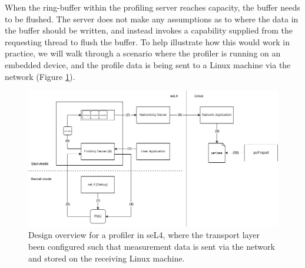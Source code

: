 When the ring-buffer within the profiling server reaches capacity, the buffer needs to be flushed. The server does not make any assumptions as to where the data in the buffer should be written, and instead invokes a capability supplied from the requesting thread to flush the buffer. To help illustrate how this would work in practice, we will walk through a scenario where the profiler is running on an embedded device, and the profile data is being sent to a Linux machine via the network (Figure \ref{fig:profiler_design}). 

\begin{figure}[h!]
    \includegraphics[width=\linewidth]{thesis_a_design_overview.drawio}
    \caption{Design overview for a profiler in seL4, where the transport layer been configured such that measurement data is sent via the network and stored on the receiving Linux machine.}
    \label{fig:profiler_design}
\end{figure}

